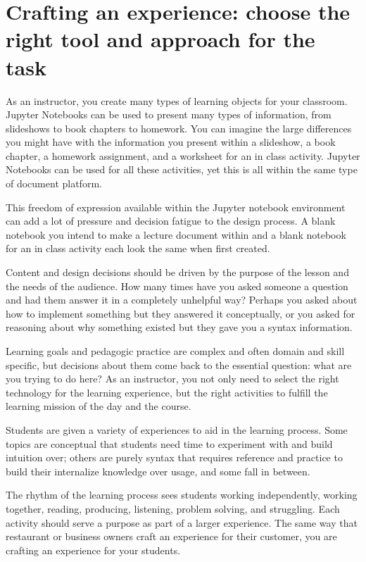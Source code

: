 \documentclass[]{book}
\begin{document}
\section{Crafting an experience: choose the right tool and approach for
the
task}\label{crafting-an-experience-choose-the-right-tool-and-approach-for-the-task}

As an instructor, you create many types of learning objects for your
classroom. Jupyter Notebooks can be used to present many types of
information, from slideshows to book chapters to homework. You can
imagine the large differences you might have with the information you
present within a slideshow, a book chapter, a homework assignment, and a
worksheet for an in class activity. Jupyter Notebooks can be used for
all these activities, yet this is all within the same type of document
platform.

This freedom of expression available within the Jupyter notebook
environment can add a lot of pressure and decision fatigue to the design
process. A blank notebook you intend to make a lecture document within
and a blank notebook for an in class activity each look the same when
first created.

Content and design decisions should be driven by the purpose of the
lesson and the needs of the audience. How many times have you asked
someone a question and had them answer it in a completely unhelpful way?
Perhaps you asked about how to implement something but they answered it
conceptually, or you asked for reasoning about why something existed but
they gave you a syntax information.

Learning goals and pedagogic practice are complex and often domain and
skill specific, but decisions about them come back to the essential
question: what are you trying to do here? As an instructor, you not only
need to select the right technology for the learning experience, but the
right activities to fulfill the learning mission of the day and the
course.

Students are given a variety of experiences to aid in the learning
process. Some topics are conceptual that students need time to
experiment with and build intuition over; others are purely syntax that
requires reference and practice to build their internalize knowledge
over usage, and some fall in between.

The rhythm of the learning process sees students working independently,
working together, reading, producing, listening, problem solving, and
struggling. Each activity should serve a purpose as part of a larger
experience. The same way that restaurant or business owners craft an
experience for their customer, you are crafting an experience for your
students.
\end{document}
